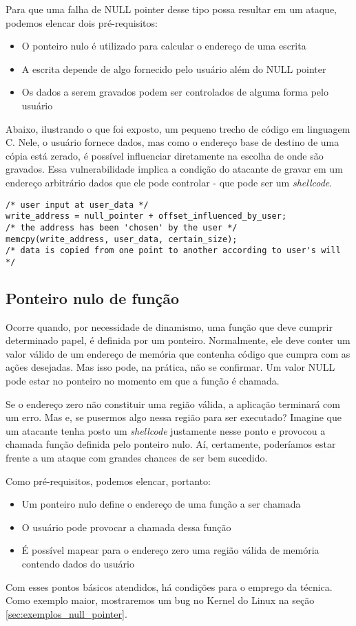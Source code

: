 			Para que uma falha de NULL pointer desse tipo possa resultar em um ataque,
			podemos elencar dois pré-requisitos:
			\begin{itemize}
				\item{O ponteiro nulo é utilizado para calcular o endereço de uma escrita}
				\item{A escrita depende de algo fornecido pelo usuário além do NULL pointer}
				\item{Os dados a serem gravados podem ser controlados de alguma forma pelo usuário}
			\end{itemize}
			Abaixo, ilustrando o que foi exposto, um pequeno trecho de código em linguagem C.
			Nele, o usuário fornece dados, mas como o endereço base de destino de uma cópia está zerado,
			é possível influenciar diretamente na escolha de onde são gravados.
			Essa vulnerabilidade implica a condição do atacante de gravar em um endereço arbitrário dados
			que ele pode controlar - que pode ser um \textsl{shellcode}.
			\begin{lstlisting}[label=write_to_address,caption=Ponteiro em C]
/* user input at user_data */
write_address = null_pointer + offset_influenced_by_user;
/* the address has been 'chosen' by the user */
memcpy(write_address, user_data, certain_size);
/* data is copied from one point to another according to user's will */
			\end{lstlisting}
			
			
		\subsection{Ponteiro nulo de função}
			Ocorre quando, por necessidade de dinamismo, uma função que deve cumprir determinado
			papel, é definida por um ponteiro. Normalmente, ele deve conter um valor válido
			de um endereço de memória que contenha código que cumpra com as ações desejadas.
			Mas isso pode, na prática, não se confirmar. Um valor NULL pode estar no ponteiro
			no momento em que a função é chamada.

			
			Se o endereço zero não constituir uma região válida, a aplicação terminará com um erro.
			Mas e, se pusermos algo nessa região para ser executado? Imagine que um atacante tenha
			posto um \textsl{shellcode} justamente nesse ponto e provocou a chamada função definida pelo
			ponteiro nulo. Aí, certamente, poderíamos estar frente a um ataque com grandes chances de
			ser bem sucedido.
			

			Como pré-requisitos, podemos elencar, portanto:
			\begin{itemize}
				\item{Um ponteiro nulo define o endereço de uma função a ser chamada}
				\item{O usuário pode provocar a chamada dessa função}
				\item{É possível mapear para o endereço zero uma região válida de memória contendo dados do usuário}
			\end{itemize}
			Com esses pontos básicos atendidos, há condições para o emprego da técnica.
			Como exemplo maior, mostraremos um bug no Kernel do Linux na seção \ref{sec:exemplos_null_pointer}. 


